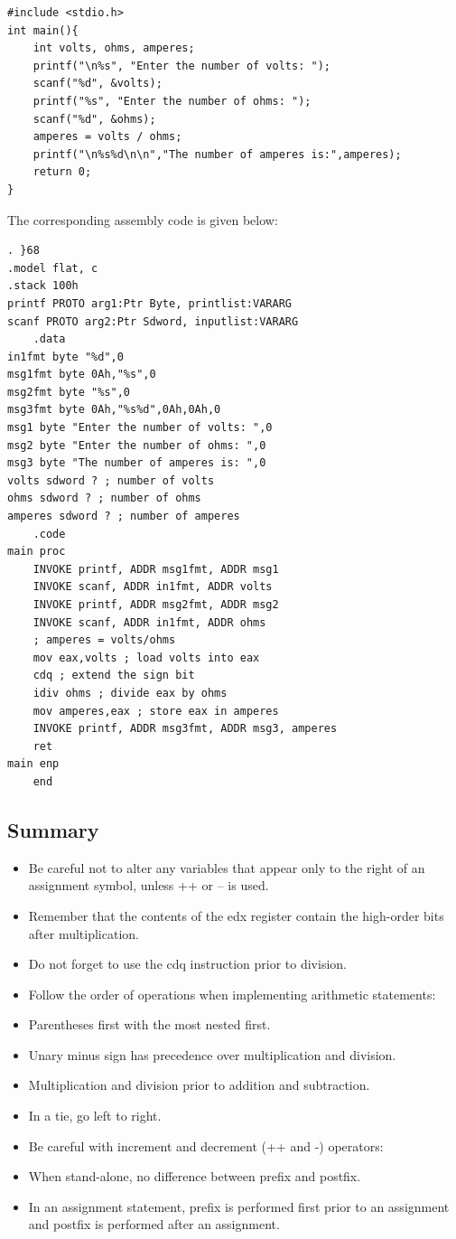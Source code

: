 \documentclass[10pt]{book}
\begin{document}
\begin{verbatim}
#include <stdio.h>
int main(){
    int volts, ohms, amperes;
    printf("\n%s", "Enter the number of volts: ");
    scanf("%d", &volts);
    printf("%s", "Enter the number of ohms: ");
    scanf("%d", &ohms);
    amperes = volts / ohms;
    printf("\n%s%d\n\n","The number of amperes is:",amperes);
    return 0;
}
\end{verbatim}

The corresponding assembly code is given below:

\begin{verbatim}
. }68
.model flat, c
.stack 100h
printf PROTO arg1:Ptr Byte, printlist:VARARG
scanf PROTO arg2:Ptr Sdword, inputlist:VARARG
    .data
in1fmt byte "%d",0
msg1fmt byte 0Ah,"%s",0
msg2fmt byte "%s",0
msg3fmt byte 0Ah,"%s%d",0Ah,0Ah,0
msg1 byte "Enter the number of volts: ",0
msg2 byte "Enter the number of ohms: ",0
msg3 byte "The number of amperes is: ",0
volts sdword ? ; number of volts
ohms sdword ? ; number of ohms
amperes sdword ? ; number of amperes
    .code
main proc
    INVOKE printf, ADDR msg1fmt, ADDR msg1
    INVOKE scanf, ADDR in1fmt, ADDR volts
    INVOKE printf, ADDR msg2fmt, ADDR msg2
    INVOKE scanf, ADDR in1fmt, ADDR ohms
    ; amperes = volts/ohms
    mov eax,volts ; load volts into eax
    cdq ; extend the sign bit
    idiv ohms ; divide eax by ohms
    mov amperes,eax ; store eax in amperes
    INVOKE printf, ADDR msg3fmt, ADDR msg3, amperes
    ret
main enp
    end
\end{verbatim}

\subsection{Summary}
\begin{itemize}
  \item Be careful not to alter any variables that appear only to the right of an assignment symbol, unless ++ or -- is used.
  \item Remember that the contents of the edx register contain the high-order bits after multiplication.
  \item Do not forget to use the cdq instruction prior to division.
  \item Follow the order of operations when implementing arithmetic statements:
  \item Parentheses first with the most nested first.
  \item Unary minus sign has precedence over multiplication and division.
  \item Multiplication and division prior to addition and subtraction.
  \item In a tie, go left to right.
  \item Be careful with increment and decrement (++ and -) operators:
  \item When stand-alone, no difference between prefix and postfix.
  \item In an assignment statement, prefix is performed first prior to an assignment and postfix is performed after an assignment.
\end{itemize}
\end{document}
